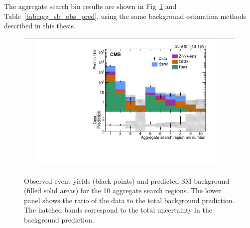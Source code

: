 The aggregate search bin results are shown in Fig~\ref{fig:aggSearchBinResults} and Table~\ref{tab:agg_sb_obs_pred}, using the same background estimation methods described in this thesis.

\begin{figure}[htb]
 \begin{center}
  \begin{tabular}{cc}
   \includegraphics[angle=0,width=0.9\textwidth]{figures/appendix/aggregatedSearchBins.pdf}
  \end{tabular}
  \caption{
  Observed event yields (black points)
  and predicted SM background (filled solid areas)
  for the 10 aggregate search regions.
  The lower panel shows the ratio of the data to
  the total background prediction.
  The hatched bands correspond to the total uncertainty in the
  background prediction.
   }
  \label{fig:aggSearchBinResults}
 \end{center}
\end{figure}


